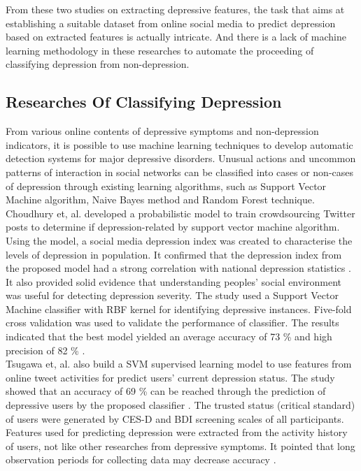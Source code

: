 \documentclass[12pt]{article}
\begin{document}
From these two studies on extracting depressive features, the task that aims at establishing a suitable dataset from online social media to predict depression based on extracted features is actually intricate. And there is a lack of machine learning methodology in these researches to automate the proceeding of classifying depression from non-depression.
\\
\medskip
\subsection{Researches Of Classifying Depression}
From various online contents of depressive symptoms and non-depression indicators, it is possible to use machine learning techniques to develop automatic detection systems for major depressive disorders. Unusual actions and uncommon patterns of interaction \cite{Wongkoblap} in social networks can be classified into cases or non-cases of depression through existing learning algorithms,  such as Support Vector Machine algorithm, Naive Bayes method and Random Forest technique.
\\

Choudhury et, al. \cite{De Choudhury} developed a probabilistic model to train crowdsourcing Twitter posts to determine if depression-related by support vector machine algorithm. Using the model, a social media depression index was created to characterise the levels of depression in population. It confirmed that the depression index from the proposed model had a strong correlation with national depression statistics \cite{De Choudhury}. It also provided solid evidence that understanding peoples' social environment was useful for detecting depression severity. The study used a Support Vector Machine classifier with RBF kernel for identifying depressive instances. Five-fold cross validation was used to validate the performance of classifier. The results indicated that the best model yielded an average accuracy of 73 \% and high precision of 82 \% \cite{De Choudhury}.
\\   

Tsugawa et, al. \cite{Tsugawa} also build a SVM supervised learning model to use features from online tweet activities for predict users' current depression status. The study showed that an accuracy of 69 \% can be reached through the prediction of depressive users by the proposed classifier \cite{Tsugawa}. The trusted status (critical standard) of users were generated by CES-D and BDI screening scales of all participants. Features used for predicting depression were extracted from the activity history of users, not like other researches from depressive symptoms. It pointed that long observation periods for collecting data may decrease accuracy \cite{Tsugawa}.  
\\
\end{document}
